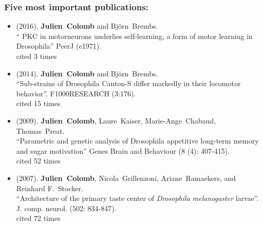 \subsubsection{Five most important publications:}
\label{sec:FiveMostImportantPublications}

\begin{sloppypar}
\newcommand{\enquote}[1]{``#1''}
\providecommand{\bibinfo}[2]{#2}
%
%

\begin{itemize}   
 
\item  (\bibinfo{year}{2016}).
  \bibinfo{author}{\textbf{Julien~Colomb}} and \bibinfo{author}{Bj\"{o}rn~Brembs}. \\
\newblock \enquote{\bibinfo{title}{ PKC in motorneurons underlies self-learning, a form of motor learning in Drosophila}}
\newblock \bibinfo{journal}{PeerJ}
  (\bibinfo{pages}{e1971}).
  \\cited 3 times%




 
\item  (\bibinfo{year}{2014}).
  \bibinfo{author}{\textbf{Julien~Colomb}} and \bibinfo{author}{Bj\"{o}rn~Brembs}. \\
\newblock \enquote{\bibinfo{title}{Sub-strains of Drosophila Canton-S differ markedly in their locomotor behavior}}.
\newblock \bibinfo{journal}{F1000RESEARCH}
  (\bibinfo{pages}{3:176}).
  \\cited 15 times%
  

\item   (\bibinfo{year}{2009}).  
 \bibinfo{author}{\textbf{Julien~Colomb}}, \bibinfo{author}{Laure~Kaiser}, \bibinfo{author}{Marie-Ange~Chabaud}, \bibinfo{author}{Thomas~Preat}.
\\
\newblock \enquote{\bibinfo{title}{Parametric and genetic analysis of Drosophila appetitive long-term memory and sugar motivation}}
\newblock \bibinfo{journal}{Genes Brain and Behaviour}
  (\bibinfo{pages}{8 (4): 407-415}).
   \\cited 52 times%
   

   

 
 
  \item  (\bibinfo{year}{2007}).
\bibinfo{author}{\textbf{Julien~Colomb}}, \bibinfo{author}{Nicola~Grillenzoni}, \bibinfo{author}{Ariane~Ramaekers}, and
  \bibinfo{author}{Reinhard F.~Stocker}.\\
\newblock \enquote{\bibinfo{title}{Architecture of the primary taste center of \textit{Drosophila melanogaster} larvae}}.
\newblock \bibinfo{journal}{J. comp. neurol.}
  (\bibinfo{pages}{502: 834-847}).
   \\  cited 72 times%




\end{itemize}
\end{sloppypar}
